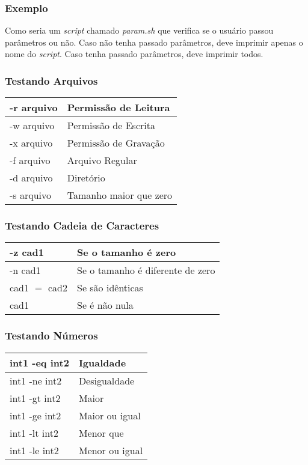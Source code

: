 \documentclass{beamer}
\begin{document}
   \begin{frame}
      \frametitle{Exemplo}
      Como seria um \textit{script} chamado \textit{param.sh} que verifica se o usuário passou parâmetros ou não. Caso não tenha passado parâmetros, deve imprimir apenas o nome do \textit{script}. Caso tenha passado parâmetros, deve imprimir todos.
   \end{frame}

   \begin{frame}
      \frametitle{Testando Arquivos}
      \begin{table}
         \begin{tabular}{l|l}
	 \hline
         -r arquivo & Permissão de Leitura \\
         \hline 
         -w arquivo & Permissão de Escrita \\
         \hline 
         -x arquivo & Permissão de Gravação \\
         \hline 
         -f arquivo & Arquivo Regular \\
         \hline 
         -d arquivo & Diretório \\
         \hline 
         -s arquivo & Tamanho maior que zero \\
         \hline 
         \end{tabular}
      \end{table}
   \end{frame}
 
   \begin{frame}
      \frametitle{Testando Cadeia de Caracteres}
      \begin{table}
         \begin{tabular}{l|l}
	 \hline
         -z cad1 & Se o tamanho é zero \\
         \hline 
         -n cad1 & Se o tamanho é diferente de zero \\
         \hline 
         cad1 $=$ cad2 & Se são idênticas \\
         \hline 
	 cad1 & Se é não nula \\
	 \hline
         \end{tabular}
      \end{table}
   \end{frame}

   \begin{frame}
      \frametitle{Testando Números}
      \begin{table}
         \begin{tabular}{l|l}
	 \hline
         int1 -eq int2 & Igualdade \\
         \hline 
         int1 -ne int2 & Desigualdade \\
         \hline 
         int1 -gt int2 & Maior \\
         \hline 
         int1 -ge int2 & Maior ou igual \\
         \hline 
         int1 -lt int2 & Menor que \\
         \hline 
         int1 -le int2 & Menor ou igual \\
         \hline 
         \end{tabular}
      \end{table}
   \end{frame}
\end{document}
